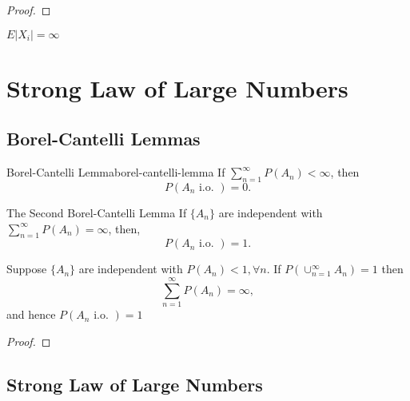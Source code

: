 \begin{proof}
    
\end{proof}

\begin{note}
    $E|X_i|=\infty$
\end{note}

\section{Strong Law of Large Numbers}

\subsection{Borel-Cantelli Lemmas}

\begin{lemma}{Borel-Cantelli Lemma}{borel-cantelli-lemma}
    If $\sum_{n=1}^{\infty}P\left(A_{n}\right)<\infty$, then
    \begin{equation}
        P\left(A_{n}\text{ i.o. }\right)=0.
    \end{equation}
\end{lemma}

\begin{lemma}{The Second Borel-Cantelli Lemma}{}
    If $\{A_n\}$ are independent with $\sum_{n=1}^{\infty}P\left(A_{n}\right)=\infty$, then,
    \begin{equation}
        P\left(A_{n}\text{ i.o. }\right)=1.
    \end{equation}
\end{lemma}

\begin{corollary}{}{}
    Suppose $\{A_{n}\}$ are independent with $P\left(A_{n}\right)<1,\forall n$. If $P\left(\cup_{n=1}^{\infty}A_{n}\right)=1$ then
    \begin{equation}
        \sum_{n=1}^{\infty}P\left(A_{n}\right)=\infty,
    \end{equation}
    and hence $P\left(A_{n}\text{ i.o. }\right)=1$
\end{corollary}

\begin{proof}

\end{proof}

\subsection{Strong Law of Large Numbers}

